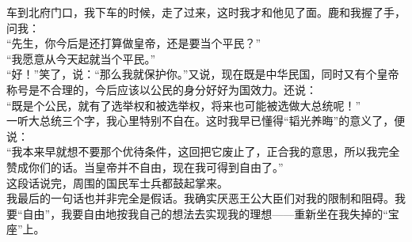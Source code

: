 车到北府门口，我下车的时候，走了过来，这时我才和他见了面。鹿和我握了手，问我：\\

“先生，你今后是还打算做皇帝，还是要当个平民？”\\

“我愿意从今天起就当个平民。”\\

“好！”笑了，说：“那么我就保护你。”又说，现在既是中华民国，同时又有个皇帝称号是不合理的，今后应该以公民的身分好好为国效力。还说：\\

“既是个公民，就有了选举权和被选举权，将来也可能被选做大总统呢！”\\

一听大总统三个字，我心里特别不自在。这时我早已懂得“韬光养晦”的意义了，便说：\\

“我本来早就想不要那个优待条件，这回把它废止了，正合我的意思，所以我完全赞成你们的话。当皇帝并不自由，现在我可得到自由了。”\\

这段话说完，周围的国民军士兵都鼓起掌来。\\

我最后的一句话也并非完全是假话。我确实厌恶王公大臣们对我的限制和阻碍。我要“自由”，我要自由地按我自己的想法去实现我的理想——重新坐在我失掉的“宝座”上。
